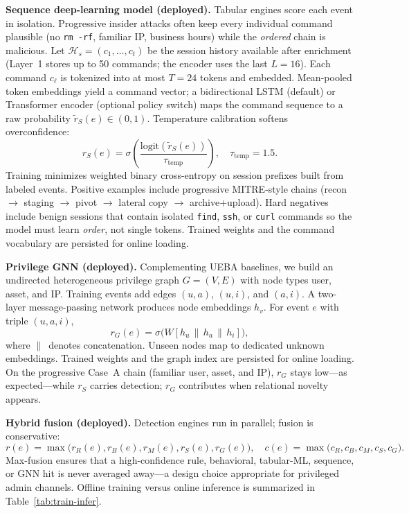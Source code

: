 \documentclass{ieeeaccess}
\begin{document}
\textbf{Sequence deep-learning model (deployed).}
Tabular engines score each event in isolation. Progressive insider attacks often keep every individual command plausible (no \texttt{rm -rf}, familiar IP, business hours) while the \textit{ordered} chain is malicious. Let $\mathcal{H}_s=(c_1,\ldots,c_t)$ be the session history available after enrichment (Layer~1 stores up to 50 commands; the encoder uses the last $L{=}16$). Each command $c_\ell$ is tokenized into at most $T{=}24$ tokens and embedded. Mean-pooled token embeddings yield a command vector; a bidirectional LSTM (default) or Transformer encoder (optional policy switch) maps the command sequence to a raw probability $\tilde{r}_S(e)\in(0,1)$. Temperature calibration softens overconfidence:
\begin{equation}
r_S(e)=\sigma\!\left(\frac{\mathrm{logit}(\tilde{r}_S(e))}{\tau_{\mathrm{temp}}}\right),
\quad \tau_{\mathrm{temp}}=1.5.
\tag{3.4}
\end{equation}
Training minimizes weighted binary cross-entropy on session prefixes built from labeled events. Positive examples include progressive MITRE-style chains (recon $\rightarrow$ staging $\rightarrow$ pivot $\rightarrow$ lateral copy $\rightarrow$ archive+upload). Hard negatives include benign sessions that contain isolated \texttt{find}, \texttt{ssh}, or \texttt{curl} commands so the model must learn \textit{order}, not single tokens. Trained weights and the command vocabulary are persisted for online loading.

\textbf{Privilege GNN (deployed).}
Complementing UEBA baselines, we build an undirected heterogeneous privilege graph $G=(V,E)$ with node types user, asset, and IP. Training events add edges $(u,a)$, $(u,i)$, and $(a,i)$. A two-layer message-passing network produces node embeddings $h_v$. For event $e$ with triple $(u,a,i)$,
\begin{equation}
r_G(e)=\sigma\!\bigl(W[h_u\,\|\,h_a\,\|\,h_i]\bigr),
\tag{3.5}
\end{equation}
where $\|\,$ denotes concatenation. Unseen nodes map to dedicated unknown embeddings. Trained weights and the graph index are persisted for online loading. On the progressive Case~A chain (familiar user, asset, and IP), $r_G$ stays low---as expected---while $r_S$ carries detection; $r_G$ contributes when relational novelty appears.

\textbf{Hybrid fusion (deployed).} Detection engines run in parallel; fusion is conservative:
\begin{equation}
r(e)=\max\bigl(r_R(e),r_B(e),r_M(e),r_S(e),r_G(e)\bigr), \quad
c(e)=\max\bigl(c_R,c_B,c_M,c_S,c_G\bigr).
\tag{4}
\end{equation}
Max-fusion ensures that a high-confidence rule, behavioral, tabular-ML, sequence, or GNN hit is never averaged away---a design choice appropriate for privileged admin channels. Offline training versus online inference is summarized in Table~\ref{tab:train-infer}.
\end{document}

